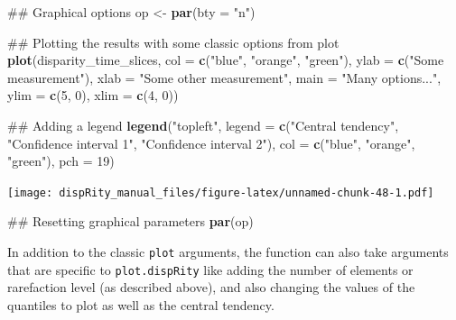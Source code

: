 \documentclass[]{book}
\newenvironment{Shaded}{\begin{snugshade}}{\end{snugshade}}
\newcommand{\KeywordTok}[1]{\textcolor[rgb]{0.13,0.29,0.53}{\textbf{#1}}}
\newcommand{\DataTypeTok}[1]{\textcolor[rgb]{0.13,0.29,0.53}{#1}}
\newcommand{\DecValTok}[1]{\textcolor[rgb]{0.00,0.00,0.81}{#1}}
\newcommand{\StringTok}[1]{\textcolor[rgb]{0.31,0.60,0.02}{#1}}
\newcommand{\NormalTok}[1]{#1}
\theoremstyle{definition}
\theoremstyle{definition}
\theoremstyle{remark}
\begin{document}
\begin{Shaded}
\begin{Highlighting}[]
\NormalTok{## Graphical options}
\NormalTok{op <-}\StringTok{ }\KeywordTok{par}\NormalTok{(}\DataTypeTok{bty =} \StringTok{"n"}\NormalTok{)}

\NormalTok{## Plotting the results with some classic options from plot}
\KeywordTok{plot}\NormalTok{(disparity_time_slices, }\DataTypeTok{col =} \KeywordTok{c}\NormalTok{(}\StringTok{"blue"}\NormalTok{, }\StringTok{"orange"}\NormalTok{, }\StringTok{"green"}\NormalTok{),}
    \DataTypeTok{ylab =} \KeywordTok{c}\NormalTok{(}\StringTok{"Some measurement"}\NormalTok{), }\DataTypeTok{xlab =} \StringTok{"Some other measurement"}\NormalTok{,}
    \DataTypeTok{main =} \StringTok{"Many options..."}\NormalTok{, }\DataTypeTok{ylim =} \KeywordTok{c}\NormalTok{(}\DecValTok{5}\NormalTok{, }\DecValTok{0}\NormalTok{), }\DataTypeTok{xlim =} \KeywordTok{c}\NormalTok{(}\DecValTok{4}\NormalTok{, }\DecValTok{0}\NormalTok{))}

\NormalTok{## Adding a legend}
\KeywordTok{legend}\NormalTok{(}\StringTok{"topleft"}\NormalTok{, }\DataTypeTok{legend =} \KeywordTok{c}\NormalTok{(}\StringTok{"Central tendency"}\NormalTok{,}
                             \StringTok{"Confidence interval 1"}\NormalTok{,}
                            \StringTok{"Confidence interval 2"}\NormalTok{),}
      \DataTypeTok{col =} \KeywordTok{c}\NormalTok{(}\StringTok{"blue"}\NormalTok{, }\StringTok{"orange"}\NormalTok{, }\StringTok{"green"}\NormalTok{), }\DataTypeTok{pch =} \DecValTok{19}\NormalTok{)}
\end{Highlighting}
\end{Shaded}

\texttt{[image: dispRity\_manual\_files/figure-latex/unnamed-chunk-48-1.pdf]}

\begin{Shaded}
\begin{Highlighting}[]
\NormalTok{## Resetting graphical parameters}
\KeywordTok{par}\NormalTok{(op)}
\end{Highlighting}
\end{Shaded}

In addition to the classic \texttt{plot} arguments, the function can
also take arguments that are specific to \texttt{plot.dispRity} like
adding the number of elements or rarefaction level (as described above),
and also changing the values of the quantiles to plot as well as the
central tendency.
\end{document}
